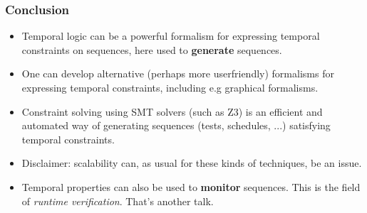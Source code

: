 
\begin{frame}[fragile]
  \frametitle{Conclusion} \small

\begin{itemize}

  \item Temporal logic can be a powerful formalism for expressing
  temporal constraints on sequences, here used to {\bf generate} sequences.

  \pause

  \item One can develop alternative (perhaps more userfriendly) formalisms
  for expressing temporal constraints, including e.g graphical formalisms.

  \pause

  \item Constraint solving using SMT solvers (such as Z3) is an efficient
  and automated way of generating sequences (tests, schedules, ...) satisfying temporal constraints.

  \pause

  \item Disclaimer: scalability can, as usual for these kinds of techniques, be an issue. 

  \pause

  \item Temporal properties can also be used to {\bf monitor} sequences. This is
  the field of {\em runtime verification}. That's another talk.

\end{itemize}


\end{frame}
